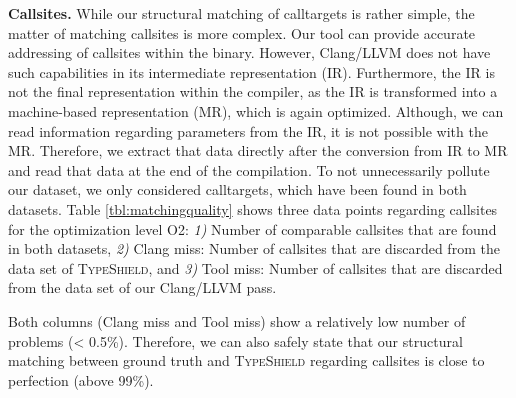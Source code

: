 \textbf{Callsites.} While our structural matching of calltargets is rather simple, the matter of matching callsites is more complex. Our tool can provide accurate addressing of callsites within the binary. However, Clang/LLVM does not have such capabilities in its intermediate representation (IR). Furthermore, the IR is not the final representation within the compiler, as the IR is transformed into a machine-based representation (MR), which is again optimized. Although, we can read information regarding parameters from the IR, it is not possible with the MR. Therefore, we extract that data directly after the conversion from IR to MR and read that data at the end of the compilation. To not unnecessarily pollute our dataset, we only considered calltargets, which have been found in both datasets. Table \ref{tbl:matchingquality} shows three data points regarding callsites for the optimization level O2:
\textit{1)} Number of comparable callsites that are found in both datasets,
\textit{2)} Clang miss: Number of callsites that are discarded from the data set of \textsc{TypeShield}, and
\textit{3)} Tool miss: Number of callsites that are discarded from the data set of our Clang/LLVM pass.

Both columns (Clang miss and Tool miss) show a relatively low number of problems (< 0.5\%). Therefore, we can also 
safely state that our structural matching between ground truth and \textsc{TypeShield} regarding callsites is close to perfection (above 99\%).

